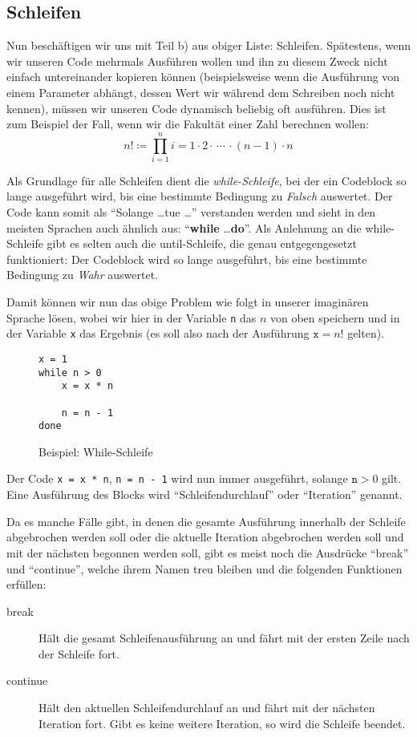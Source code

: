 \subsection{Schleifen} \imperativeMark \oopMark

	Nun beschäftigen wir uns mit Teil b) aus obiger Liste: Schleifen. Spätestens, wenn wir unseren Code mehrmals Ausführen wollen und ihn zu diesem Zweck nicht einfach untereinander kopieren können (beispielsweise wenn die Ausführung von einem Parameter abhängt, dessen Wert wir während dem Schreiben noch nicht kennen), müssen wir unseren Code dynamisch beliebig oft ausführen. Dies ist zum Beispiel der Fall, wenn wir die Fakultät einer Zahl berechnen wollen: \[ n! \coloneqq \prod _ { i = 1 } ^ n i = 1 \cdot 2 \cdot\,\cdots\,\cdot (n - 1) \cdot n \]
	
	Als Grundlage für alle Schleifen dient die \textit{while-Schleife}, bei der ein Codeblock so lange ausgeführt wird, bis eine bestimmte Bedingung zu \textit{Falsch} auswertet. Der Code kann somit als \enquote{Solange \dots tue \dots} verstanden werden und sieht in den meisten Sprachen auch ähnlich aus: \enquote{\textbf{while} \dots \textbf{do}}. Als Anlehnung an die while-Schleife gibt es selten auch die until-Schleife, die genau entgegengesetzt funktioniert: Der Codeblock wird so lange ausgeführt, bis eine bestimmte Bedingung zu \textit{Wahr} auswertet.
	
	Damit können wir nun das obige Problem wie folgt in unserer imaginären Sprache lösen, wobei wir hier in der Variable \texttt{n} das \( n \) von oben speichern und in der Variable \texttt{x} das Ergebnis (es soll also nach der Ausführung $ \texttt{x} = n! $ gelten).
	\begin{figure}[H]
		\centering
		\begin{lstlisting}
x = 1
while n > 0
	x = x * n

	n = n - 1
done
		\end{lstlisting}
		\caption{Beispiel: While-Schleife}
	\end{figure}
	
	Der Code \texttt{x = x * n}, \texttt{n = n - 1} wird nun immer ausgeführt, solange \( \texttt{n} > 0 \) gilt. Eine Ausführung des Blocks wird \enquote{Schleifendurchlauf} oder \enquote{Iteration} genannt.
	
	Da es manche Fälle gibt, in denen die gesamte Ausführung innerhalb der Schleife abgebrochen werden soll oder die aktuelle Iteration abgebrochen werden soll und mit der nächsten begonnen werden soll, gibt es meist noch die Ausdrücke \enquote{break} und \enquote{continue}, welche ihrem Namen treu bleiben und die folgenden Funktionen erfüllen:
	\begin{description}
		\item[break] Hält die gesamt Schleifenausführung an und fährt mit der ersten Zeile nach der Schleife fort.
		\item[continue] Hält den aktuellen Schleifendurchlauf an und fährt mit der nächsten Iteration fort. Gibt es keine weitere Iteration, so wird die Schleife beendet.
	\end{description}
